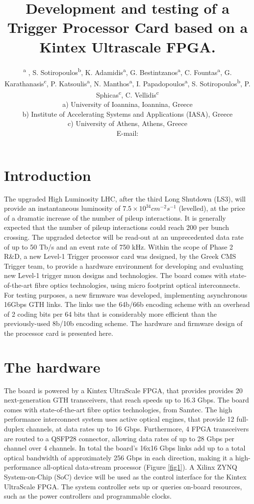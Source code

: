 \documentclass[a4paper]{PoS}
\title{Development and testing of a Trigger Processor Card based on a Kintex Ultrascale FPGA.}
\author{\speaker{S. Mallios}\textsuperscript{a} , S. Sotiropoulos\textsuperscript{b}, K. Adamidis\textsuperscript{a}, G. Bestintzanos\textsuperscript{a}, C. Fountas\textsuperscript{a}, G. Karathanasis\textsuperscript{c}, P. Katsoulis\textsuperscript{a}, N. Manthos\textsuperscript{a}, I. Papadopoulos\textsuperscript{a}, S. Sotiropoulos\textsuperscript{b}, P. Sphicas\textsuperscript{c}, C. Vellidis\textsuperscript{c}\\
\llap a) University of Ioannina, Ioannina, Greece\\
\llap b) Institute of Accelerating Systems and Applications (IASA), Greece\\
\llap c) University of Athens, Athens, Greece\\
E-mail: \email{stavros.mallios@cern.ch@mail.org}}
\begin{document}


\section{Introduction}
The upgraded High Luminosity LHC, after the third Long Shutdown (LS3), will provide an instantaneous luminosity of $7.5 \times 10^{34} cm^{-2} s^{-1}$ (levelled), at the price of a dramatic increase of the number of pileup interactions. It is generally expected that the number of pileup interactions could reach 200 per bunch crossing. The upgraded detector will be read-out at an unprecedented data rate of up to 50 Tb/s and an event rate of 750 kHz. Within the scope of Phase 2 R\&D, a new Level-1 Trigger processor card was designed, by the Greek CMS Trigger team, to provide a hardware environment for developing and evaluating new Level-1 trigger muon designs and technologies. The board comes with state-of-the-art fibre optics technologies, using micro footprint optical interconnects. For testing purposes, a new firmware was developed, implementing asynchronous 16Gbps GTH links. The links use the 64b/66b encoding scheme with an overhead of 2 coding bits per 64 bits that is considerably more efficient than the previously-used 8b/10b encoding scheme. The hardware and firmware design of the processor card is presented here.

\section{The hardware}
The board is powered by a Kintex UltraScale FPGA, that provides provides 20 next-generation GTH transceivers, that reach speeds up to 16.3 Gbps. The board comes with state-of-the-art fibre optics technologies, from Samtec. The high performance interconnect system uses active optical engines, that provide 12 full-duplex channels, at data rates up to 16 Gbps. Furthermore, 4 FPGA transceivers are routed to a QSFP28 connector, allowing data rates of up to 28 Gbps per channel over 4 channels. In total the board’s 16x16 Gbps links add up to a total optical bandwidth of approximately 256 Gbps in each direction, making it a high-performance all-optical data-stream processor (Figure \ref{fig1}). A Xilinx ZYNQ System-on-Chip (SoC) device will be used as the control interface for the Kintex UltraScale FPGA. The system controller sets up or queries on-board resources, such as the power controllers and programmable clocks.\\
\end{document}
